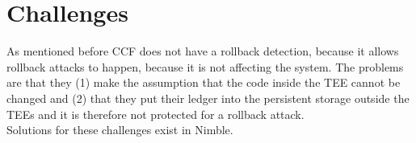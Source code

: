 \section{Challenges}
\label{challenges:ccf}
As mentioned before CCF does not have a rollback detection, because it allows rollback attacks to happen, because it is not affecting the system. The problems are that they (1) make the assumption that the code inside the TEE cannot be changed and (2) that they put their ledger into the persistent storage outside the TEEs and  it is therefore not protected for a rollback attack.\\
Solutions for these challenges exist in Nimble. 